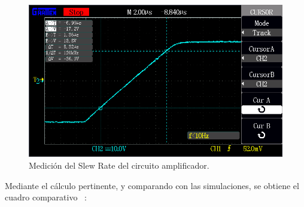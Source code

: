 \begin{figure}[H]
        \centering
        \includegraphics[width=0.95 \textwidth]{./img/mediciones/Slew_Rate/2.png}
        \caption{Medición del Slew Rate del circuito amplificador.}
        \label{fig:Slew_rate_amplifier}
\end{figure}

Mediante el cálculo pertinente, y comparando con las simulaciones, se obtiene el cuadro comparativo  ~:



\begin{table}[H]  %
    
    \setlength\arrayrulewidth{1.5pt}
    \def\clinecolor{\hhline{|>{\arrayrulecolor{white}}-%
    >{\arrayrulecolor{white}}|-|-|-|-|}}
    
\begin{center}  
    \caption{Comparación del Slew Rate.}
    \label{tab:comp_SlewRate}
	\end{center}
\end{table}











